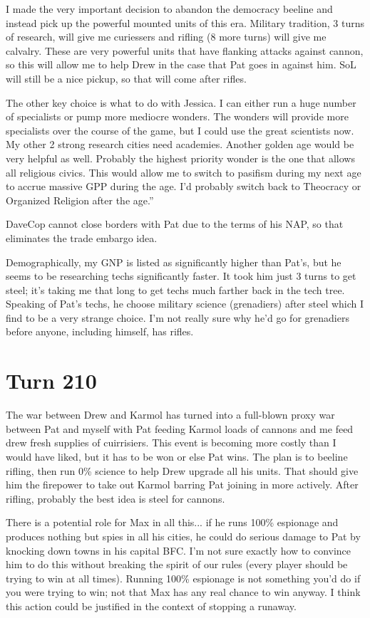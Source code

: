 \documentclass[10pt]{article}
\begin{document}
I made the very important decision to abandon the democracy beeline
and instead pick up the powerful mounted units of this era. Military
tradition, 3 turns of research, will give me curiessers and rifling (8
more turns) will give me calvalry. These are very powerful units that
have flanking attacks against cannon, so this will allow me to help
Drew in the case that Pat goes in against him. SoL will still be a
nice pickup, so that will come after rifles.

The other key choice is what to do with Jessica. I can either run a
huge number of specialists or pump more mediocre wonders. The wonders
will provide more specialists over the course of the game, but I could
use the great scientists now. My other 2 strong research cities need
academies. Another golden age would be very helpful as well. Probably
the highest priority wonder is the one that allows all religious
civics. This would allow me to switch to pasifism during my next age
to accrue massive GPP during the age. I'd probably switch back to
Theocracy or Organized Religion after the age.''

DaveCop cannot close borders with Pat due to the terms of his NAP, so that eliminates the trade embargo idea.

Demographically, my GNP is listed as significantly higher than Pat's,
but he seems to be researching techs significantly faster. It took him
just 3 turns to get steel; it's taking me that long to get techs much
farther back in the tech tree. Speaking of Pat's techs, he choose
military science (grenadiers) after steel which I find to be a very
strange choice. I'm not really sure why he'd go for grenadiers before
anyone, including himself, has rifles.

\section*{Turn 210}

The war between Drew and Karmol has turned into a full-blown proxy war
between Pat and myself with Pat feeding Karmol loads of cannons and me
feed drew fresh supplies of cuirrisiers. This event is becoming more
costly than I would have liked, but it has to be won or else Pat
wins. The plan is to beeline rifling, then run 0\% science to help
Drew upgrade all his units. That should give him the firepower to take
out Karmol barring Pat joining in more actively. After rifling,
probably the best idea is steel for cannons.

There is a potential role for Max in all this... if he runs 100\%
espionage and produces nothing but spies in all his cities, he could
do serious damage to Pat by knocking down towns in his capital
BFC. I'm not sure exactly how to convince him to do this without
breaking the spirit of our rules (every player should be trying to win
at all times). Running 100\% espionage is not something you'd do if
you were trying to win; not that Max has any real chance to win
anyway. I think this action could be justified in the context of
stopping a runaway.
\end{document}
